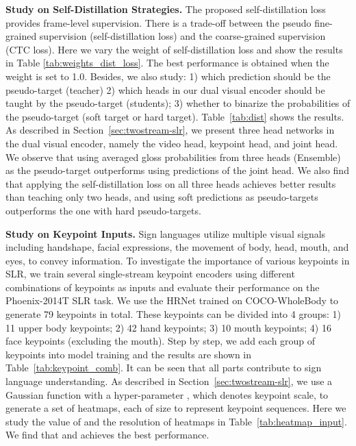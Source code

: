 \documentclass{article}
\begin{document}
\textbf{Study on Self-Distillation Strategies.} The proposed self-distillation loss provides frame-level supervision. There is a trade-off between the pseudo fine-grained supervision (self-distillation loss) and the coarse-grained supervision (CTC loss). Here we vary the weight of self-distillation loss  and show the results in Table \ref{tab:weights_dist_loss}. The best performance is obtained when the weight is set to 1.0.
Besides, we also study: 1) which prediction should be the pseudo-target (teacher) 2) which heads in our dual visual encoder should be taught by the pseudo-target (students); 3) whether to binarize the probabilities of the pseudo-target (soft target or hard target). Table~\ref{tab:dist} shows the results. As described in Section~\ref{sec:twostream-slr}, we present three head networks in the dual visual encoder, namely the video head, keypoint head, and joint head. We observe that using averaged gloss probabilities from three heads (Ensemble) as the pseudo-target outperforms using predictions of the joint head. We also find that applying the self-distillation loss on all three heads achieves better results than teaching only two heads, and using soft predictions as pseudo-targets outperforms the one with hard pseudo-targets.


\textbf{Study on Keypoint Inputs.}
Sign languages utilize multiple visual signals including handshape, facial expressions, the movement of body, head, mouth, and eyes, to convey information. To investigate the importance of various keypoints in SLR, we train several single-stream keypoint encoders using different combinations of keypoints as inputs and evaluate their performance on the Phoenix-2014T SLR task. We use the HRNet trained on COCO-WholeBody to generate 79 keypoints in total. These keypoints can be divided into 4 groups: 1) 11 upper body keypoints; 2) 42 hand keypoints; 3) 10 mouth keypoints; 4) 16 face keypoints (excluding the mouth). Step by step, we add each group of keypoints into model training and the results are shown in Table~\ref{tab:keypoint_comb}. It can be seen that all parts contribute to sign language understanding. As described in Section~\ref{sec:twostream-slr}, we use a Gaussian function with a hyper-parameter , which denotes keypoint scale, to generate a set of heatmaps, each of size  to represent keypoint sequences. Here we study the value of  and the resolution of heatmaps in Table~\ref{tab:heatmap_input}. We find that  and  achieves the best performance.
\end{document}
